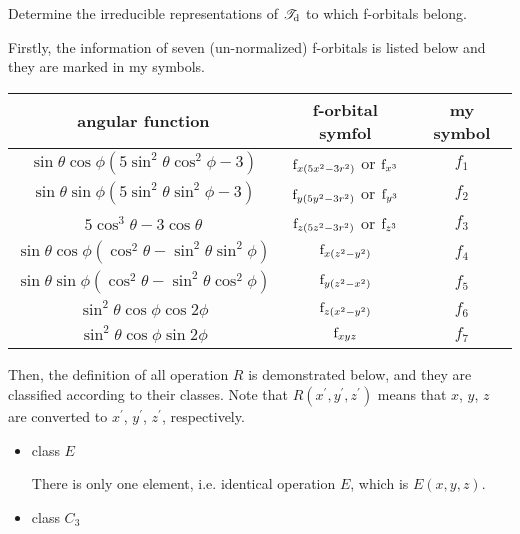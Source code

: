\documentclass[a4paper]{book}
\newcommand{\orb}[1]{{\rm #1}}
\newcommand{\orbf}{\orb{f}}
\begin{document}
	\setcounter{chapter}{11}

	\begin{exercise}
		Determine the irreducible representations of $\mathscr{T}_{\rm d}$ to which f-orbitals belong.
	\end{exercise}

	\begin{solution}

		Firstly, the information of seven (un-normalized) f-orbitals is listed below and they are marked in my symbols.
		\begin{center}
		\begin{tabular}{ccc}\hline
		angular function &	f-orbital symfol & 	my symbol \\ \hline
	$\sin\theta\cos\phi(5\sin^2\theta\cos^2\phi-3)$ &	$\orbf_{x(5x^2-3r^2)}$ or $\orbf_{x^3}$ & $f_1$ \\
	$\sin\theta\sin\phi(5\sin^2\theta\sin^2\phi-3)$ &	$\orbf_{y(5y^2-3r^2)}$ or $\orbf_{y^3}$ & $f_2$ \\
	$5\cos^3\theta - 3\cos\theta$ &	$\orbf_{z(5z^2-3r^2)}$ or $\orbf_{z^3}$ & $f_3$ \\
	$\sin\theta\cos\phi(\cos^2\theta-\sin^2\theta\sin^2\phi)$ &	$\orbf_{x(z^2-y^2)}$ & $f_4$ \\
	$\sin\theta\sin\phi(\cos^2\theta-\sin^2\theta\cos^2\phi)$ &	$\orbf_{y(z^2-x^2)}$ & $f_5$ \\
	$\sin^2\theta\cos\phi\cos2\phi$ & $\orbf_{z(x^2-y^2)}$ & $f_6$ \\
	$\sin^2\theta\cos\phi\sin2\phi$ & $\orbf_{xyz}$ & $f_7$ \\\hline
		\end{tabular}
		\end{center}
		
		Then, the definition of all operation $R$ is demonstrated below, and they are classified according to their classes. Note that $R(x^\prime,y^\prime,z^\prime)$ means that $x$, $y$, $z$ are converted to $x^\prime$, $y^\prime$, $z^\prime$, respectively.
		\begin{itemize}

		\item class $E$
		
		There is only one element, i.e. identical operation $E$, which is $E(x,y,z)$.
		
		\item class $C_3$


\end{itemize}
\end{solution}
\end{document}
